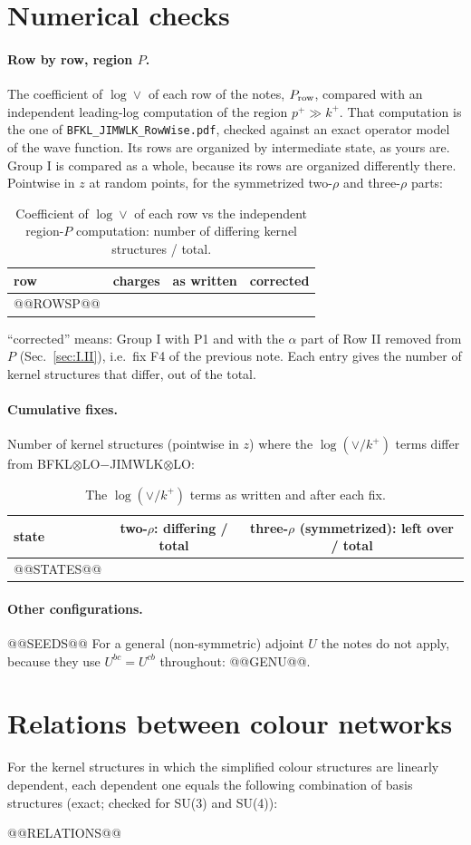 \documentclass[10pt]{article}
\numberwithin{equation}{section}
\newcommand{\kp}{k^+}
\newcommand{\pp}{p^+}
\begin{document}
\section{Numerical checks}\label{sec:checks}
\paragraph{Row by row, region $P$.} The coefficient of $\log\vee$ of each row of the notes, $P_{\rm row}$, compared with an independent leading-log computation of the region $\pp\gg\kp$. That computation is the one of \texttt{BFKL\_JIMWLK\_RowWise.pdf}, checked against an exact operator model of the wave function. Its rows are organized by intermediate state, as yours are. Group I is compared as a whole, because its rows are organized differently there. Pointwise in $z$ at random points, for the symmetrized two-$\rho$ and three-$\rho$ parts:
\begin{table}[H]
\centering\small
\begin{tabular}{@{}l c l l@{}}
row & charges & as written & corrected \\ \hline
@@ROWSP@@
\end{tabular}
\caption{Coefficient of $\log\vee$ of each row vs the independent region-$P$ computation: number of differing kernel structures / total.}\label{tab:rowsP}
\end{table}
``corrected'' means: Group I with P1 and with the $\alpha$ part of Row II removed from $P$ (Sec.~\ref{sec:I.II}), i.e.\ fix F4 of the previous note. Each entry gives the number of kernel structures that differ, out of the total.

\paragraph{Cumulative fixes.} Number of kernel structures (pointwise in $z$) where the $\log(\vee/k^+)$ terms differ from BFKL$\otimes$LO$-$JIMWLK$\otimes$LO:
\begin{table}[H]
\centering\small
\begin{tabular}{@{}l c c@{}}
state & two-$\rho$: differing / total & three-$\rho$ (symmetrized): left over / total\\ \hline
@@STATES@@
\end{tabular}
\caption{The $\log(\vee/k^+)$ terms as written and after each fix.}\label{tab:states}
\end{table}

\paragraph{Other configurations.} @@SEEDS@@ For a general (non-symmetric) adjoint $U$ the notes do not apply, because they use $U^{bc}=U^{cb}$ throughout: @@GENU@@.

\appendix
\section{Relations between colour networks}\label{app:rel}
For the kernel structures in which the simplified colour structures are linearly dependent, each dependent one equals the following combination of basis structures (exact; checked for SU(3) and SU(4)):

@@RELATIONS@@
\end{document}
